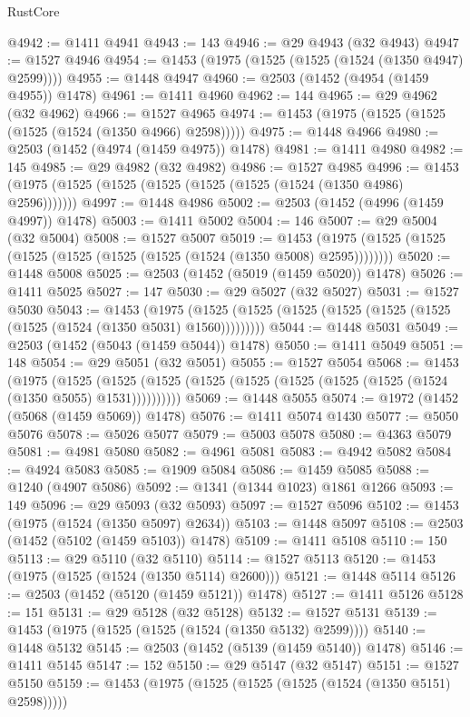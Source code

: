 \begin{lexlean}{RustCore}
\begin{coremodule}
@4942 := @1411 @4941
@4943 := 143
@4946 := @29 @4943 (@32 @4943)
@4947 := @1527 @4946
@4954 := @1453 (@1975 (@1525 (@1525 (@1524 (@1350 @4947) @2599))))
@4955 := @1448 @4947
@4960 := @2503 (@1452 (@4954 (@1459 @4955)) @1478)
@4961 := @1411 @4960
@4962 := 144
@4965 := @29 @4962 (@32 @4962)
@4966 := @1527 @4965
@4974 := @1453 (@1975 (@1525 (@1525 (@1525 (@1524 (@1350 @4966) @2598)))))
@4975 := @1448 @4966
@4980 := @2503 (@1452 (@4974 (@1459 @4975)) @1478)
@4981 := @1411 @4980
@4982 := 145
@4985 := @29 @4982 (@32 @4982)
@4986 := @1527 @4985
@4996 := @1453 (@1975 (@1525 (@1525 (@1525 (@1525 (@1525 (@1524 (@1350 @4986) @2596)))))))
@4997 := @1448 @4986
@5002 := @2503 (@1452 (@4996 (@1459 @4997)) @1478)
@5003 := @1411 @5002
@5004 := 146
@5007 := @29 @5004 (@32 @5004)
@5008 := @1527 @5007
@5019 := @1453 (@1975 (@1525 (@1525 (@1525 (@1525 (@1525 (@1525 (@1524 (@1350 @5008) @2595))))))))
@5020 := @1448 @5008
@5025 := @2503 (@1452 (@5019 (@1459 @5020)) @1478)
@5026 := @1411 @5025
@5027 := 147
@5030 := @29 @5027 (@32 @5027)
@5031 := @1527 @5030
@5043 := @1453
    (@1975 (@1525 (@1525 (@1525 (@1525 (@1525 (@1525 (@1525 (@1524 (@1350 @5031) @1560)))))))))
@5044 := @1448 @5031
@5049 := @2503 (@1452 (@5043 (@1459 @5044)) @1478)
@5050 := @1411 @5049
@5051 := 148
@5054 := @29 @5051 (@32 @5051)
@5055 := @1527 @5054
@5068 := @1453
    (@1975
      (@1525 (@1525 (@1525 (@1525 (@1525 (@1525 (@1525 (@1525 (@1524 (@1350 @5055) @1531))))))))))
@5069 := @1448 @5055
@5074 := @1972 (@1452 (@5068 (@1459 @5069)) @1478)
@5076 := @1411 @5074 @1430
@5077 := @5050 @5076
@5078 := @5026 @5077
@5079 := @5003 @5078
@5080 := @4363 @5079
@5081 := @4981 @5080
@5082 := @4961 @5081
@5083 := @4942 @5082
@5084 := @4924 @5083
@5085 := @1909 @5084
@5086 := @1459 @5085
@5088 := @1240 (@4907 @5086)
@5092 := @1341 (@1344 @1023) @1861 @1266
@5093 := 149
@5096 := @29 @5093 (@32 @5093)
@5097 := @1527 @5096
@5102 := @1453 (@1975 (@1524 (@1350 @5097) @2634))
@5103 := @1448 @5097
@5108 := @2503 (@1452 (@5102 (@1459 @5103)) @1478)
@5109 := @1411 @5108
@5110 := 150
@5113 := @29 @5110 (@32 @5110)
@5114 := @1527 @5113
@5120 := @1453 (@1975 (@1525 (@1524 (@1350 @5114) @2600)))
@5121 := @1448 @5114
@5126 := @2503 (@1452 (@5120 (@1459 @5121)) @1478)
@5127 := @1411 @5126
@5128 := 151
@5131 := @29 @5128 (@32 @5128)
@5132 := @1527 @5131
@5139 := @1453 (@1975 (@1525 (@1525 (@1524 (@1350 @5132) @2599))))
@5140 := @1448 @5132
@5145 := @2503 (@1452 (@5139 (@1459 @5140)) @1478)
@5146 := @1411 @5145
@5147 := 152
@5150 := @29 @5147 (@32 @5147)
@5151 := @1527 @5150
@5159 := @1453 (@1975 (@1525 (@1525 (@1525 (@1524 (@1350 @5151) @2598)))))

\end{coremodule}
\end{lexlean}
